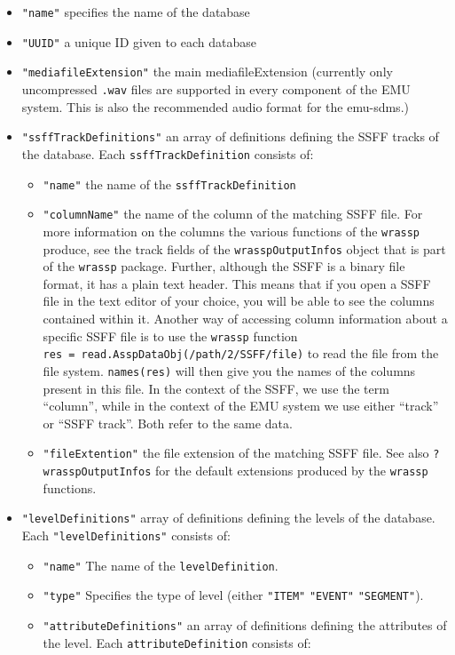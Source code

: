 \documentclass[]{book}
\begin{document}
\begin{itemize}
\item
  \texttt{"name"} specifies the name of the database
\item
  \texttt{"UUID"} a unique ID given to each database
\item
  \texttt{"mediafileExtension"} the main mediafileExtension (currently only uncompressed \texttt{.wav} files are supported in every component of the EMU system. This is also the recommended audio format for the {emu-sdms}.)
\item
  \texttt{"ssffTrackDefinitions"} an array of definitions defining the SSFF tracks of the database. Each \texttt{ssffTrackDefinition} consists of:

  \begin{itemize}
  \item
    \texttt{"name"} the name of the \texttt{ssffTrackDefinition}
  \item
    \texttt{"columnName"} the name of the column of the matching SSFF file. For more information on the columns the various functions of the \texttt{wrassp} produce, see the track fields of the \texttt{wrasspOutputInfos} object that is part of the \texttt{wrassp} package. Further, although the SSFF is a binary file format, it has a plain text header. This means that if you open a SSFF file in the text editor of your choice, you will be able to see the columns contained within it. Another way of accessing column information about a specific SSFF file is to use the \texttt{wrassp} function \texttt{res~=~read.AsspDataObj(/path/2/SSFF/file)} to read the file from the file system. \texttt{names(res)} will then give you the names of the columns present in this file. In the context of the SSFF, we use the term ``column'', while in the context of the EMU system we use either ``track'' or ``SSFF track''. Both refer to the same data.
  \item
    \texttt{"fileExtention"} the file extension of the matching SSFF file. See also \texttt{?wrasspOutputInfos} for the default extensions produced by the \texttt{wrassp} functions.
  \end{itemize}
\item
  \texttt{"levelDefinitions"} array of definitions defining the levels of the database. Each \texttt{"levelDefinitions"} consists of:

  \begin{itemize}
  \item
    \texttt{"name"} The name of the \texttt{levelDefinition}.
  \item
    \texttt{"type"} Specifies the type of level (either \texttt{"ITEM"} \textbar{} \texttt{"EVENT"} \textbar{} \texttt{"SEGMENT"}).
  \item
    \texttt{"attributeDefinitions"} an array of definitions defining the
    attributes of the level. Each \texttt{attributeDefinition} consists of:


\end{itemize}
\end{itemize}
\end{document}
